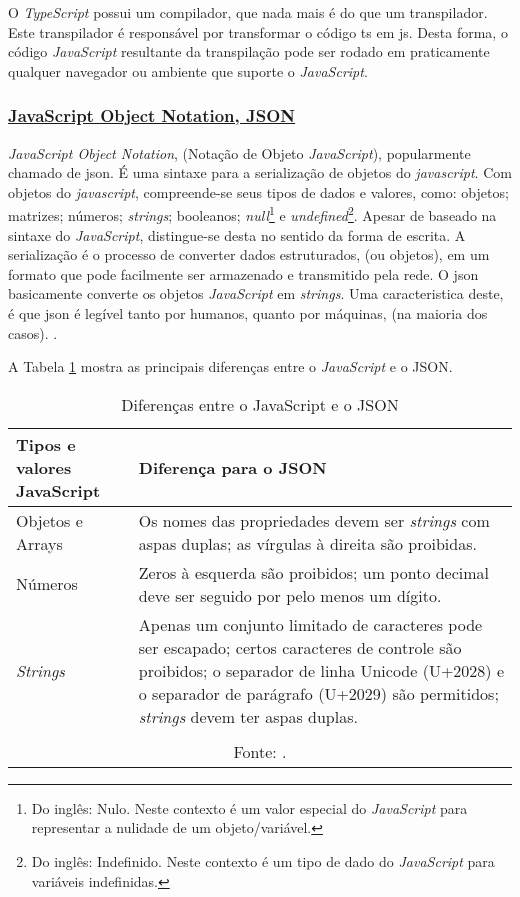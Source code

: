 O \textit{TypeScript} possui um compilador, que nada mais é do que um
transpilador. Este transpilador é responsável por transformar o
código
\acrshort{ts} em
\acrshort{js}.
Desta forma, o código \textit{JavaScript} resultante da
transpilação pode ser rodado em praticamente qualquer
navegador ou ambiente que suporte o \textit{JavaScript}.

\subsubsection{\underline{JavaScript Object Notation, JSON}}

\textit{JavaScript Object Notation}, (Notação de Objeto \textit{JavaScript}),
popularmente chamado de \acrshort{json}. É uma sintaxe para a serialização de
objetos do \textit{javascript}. Com objetos do \textit{javascript}, compreende-se seus tipos
de dados e valores, como: objetos; matrizes; números; \textit{strings}; booleanos;
\textit{null}\footnote{Do inglês: Nulo. Neste contexto é um valor especial do \textit{JavaScript} para
    representar a nulidade de um objeto/variável.
}
e
\textit{undefined}\footnote{Do inglês: Indefinido. Neste contexto é um tipo de dado do \textit{JavaScript}
    para variáveis indefinidas.
}.
Apesar de baseado na sintaxe do \textit{JavaScript}, distingue-se desta
no sentido da forma de escrita. A serialização é o processo
de converter dados estruturados, (ou objetos), em um formato que pode
facilmente ser armazenado e transmitido pela rede. O \acrshort{json}
basicamente converte os objetos \textit{JavaScript} em \textit{strings}. Uma caracteristica deste,
é que \acrshort{json} é legível tanto por humanos, quanto por máquinas,
(na maioria dos casos).
\cite{mdn-json}.

A
Tabela \ref{tbl:json-descs}
mostra as principais
diferenças entre o \textit{JavaScript} e o JSON.

\begin{table}[H]
    \centering
    \caption{Diferenças entre o JavaScript e o JSON}
    \label{tbl:json-descs}
    \renewcommand{\arraystretch}{1.5}
    \begin{tabular}{p{5.6000cm} p{10.4000cm}}
        \hline
        \textbf{Tipos e valores JavaScript} & \textbf{Diferença para o JSON} \\
        \hline
        Objetos e Arrays & Os nomes das propriedades devem ser \textit{strings} com aspas duplas; as vírgulas à direita são proibidas. \\
		Números & Zeros à esquerda são proibidos; um ponto decimal deve ser seguido por pelo menos um dígito. \\
		\textit{Strings} & Apenas um conjunto limitado de caracteres pode ser escapado; certos caracteres de controle são proibidos; o separador de linha Unicode (U+2028) e o separador de parágrafo (U+2029) são permitidos; \textit{strings} devem ter aspas duplas.
             \\
        \hline
        \\\multicolumn{2}{c}{\fontsize{10pt}{12pt}Fonte: \cite{mdn-json}.}
    \end{tabular}
\end{table}

